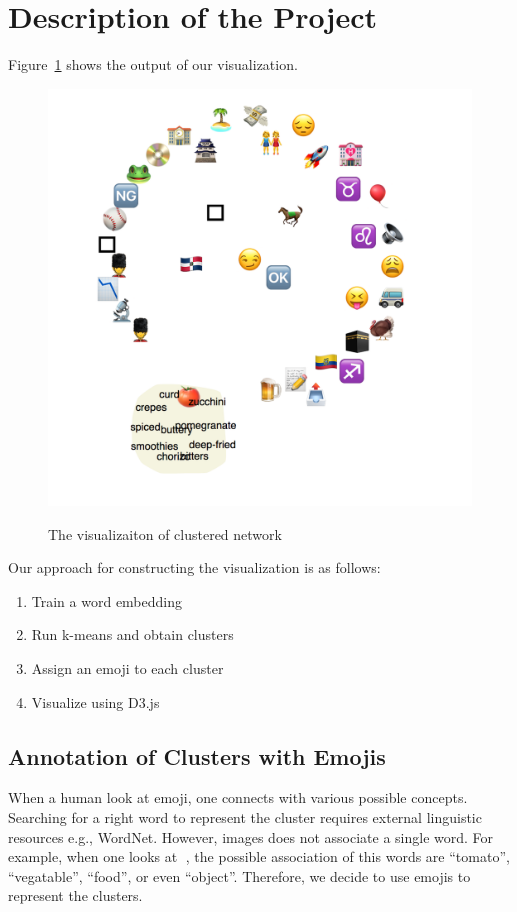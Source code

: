 \section{Description of the Project}
Figure~\ref{fig:cluster_network} shows the output of our visualization. 

\begin{figure}[htb]
 \centering
     {\includegraphics[width=0.48\linewidth]{clustered_network.png}}
    \vspace{-1ex}
     \caption{The visualizaiton of clustered network}
\label{fig:cluster_network}
\end{figure}


Our approach for constructing the visualization is as follows:
\begin{enumerate}
 \item Train a word embedding
 \item Run k-means and obtain clusters
 \item Assign an emoji to each cluster
 \item Visualize using D3.js
\end{enumerate}

\subsection{Annotation of Clusters with Emojis}
When a human look at emoji, one connects with various possible concepts. 
Searching for a right word to represent the cluster requires external linguistic resources e.g., WordNet. 
However, images does not associate a single word. 
For example, when one looks at 🍅, the possible association of this words are ``tomato'', ``vegatable'', ``food'', or even ``object''. 
Therefore, we decide to use emojis to represent the clusters. 
